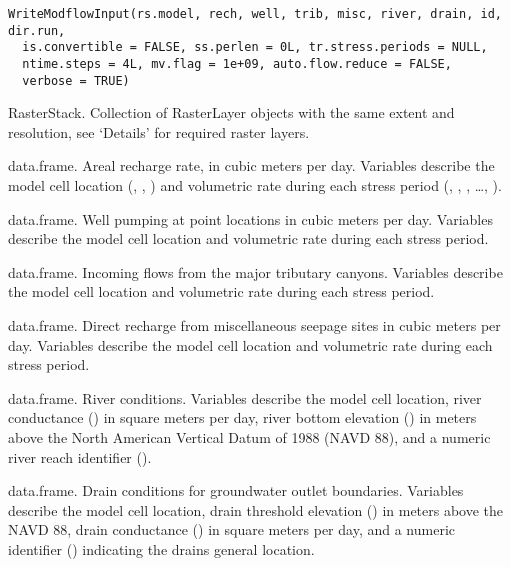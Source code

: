 \documentclass[a4paper]{book}
\begin{document}
%
\begin{Usage}
\begin{verbatim}
WriteModflowInput(rs.model, rech, well, trib, misc, river, drain, id, dir.run,
  is.convertible = FALSE, ss.perlen = 0L, tr.stress.periods = NULL,
  ntime.steps = 4L, mv.flag = 1e+09, auto.flow.reduce = FALSE,
  verbose = TRUE)
\end{verbatim}
\end{Usage}
%
\begin{Arguments}
\begin{ldescription}
\item[\code{rs.model}] RasterStack.
Collection of RasterLayer objects with the same extent and resolution,
see `Details' for required raster layers.

\item[\code{rech}] data.frame.
Areal recharge rate, in cubic meters per day.
Variables describe the model cell location (, , ) and
volumetric rate during each stress period
(, , , \dots, ).

\item[\code{well}] data.frame.
Well pumping at point locations in cubic meters per day.
Variables describe the model cell location and volumetric rate during each stress period.

\item[\code{trib}] data.frame.
Incoming flows from the major tributary canyons.
Variables describe the model cell location and volumetric rate during each stress period.

\item[\code{misc}] data.frame.
Direct recharge from miscellaneous seepage sites in cubic meters per day.
Variables describe the model cell location and volumetric rate during each stress period.

\item[\code{river}] data.frame.
River conditions.
Variables describe the model cell location, river conductance
() in square meters per day, river bottom elevation () in
meters above the North American Vertical Datum of 1988 (NAVD 88), and
a numeric river reach identifier ().

\item[\code{drain}] data.frame.
Drain conditions for groundwater outlet boundaries.
Variables describe the model cell location, drain threshold elevation
() in meters above the NAVD 88, drain conductance () in
square meters per day, and a numeric identifier () indicating the
drains general location.


\end{ldescription}
\end{Arguments}
\end{document}
